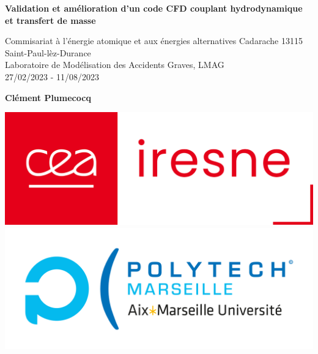 \documentclass[a4paper,11pt]{report}    %
\begin{document}

\hypersetup{pageanchor=false}
\begin{titlepage}
    \begin{center}
        \vspace*{1cm}

        \Huge
        \textbf{Validation et amélioration d'un code CFD couplant hydrodynamique et transfert de masse}

        \vspace{0.5cm}
        \LARGE
        Commisariat à l'énergie atomique et aux énergies alternatives Cadarache 13115 Saint-Paul-lèz-Durance\\
        Laboratoire de Modélisation des Accidents Graves, LMAG\\
        27/02/2023 - 11/08/2023
        \vspace{1.5cm}

        \textbf{Clément Plumecocq}

        \vfill

        \includegraphics[scale=0.15]{logo_iresne.png}\includegraphics[scale=0.20]{polytech.jpg}

        \vfill

        \Large
        \noindent{}
    \end{center}
\end{titlepage}
\end{document}
